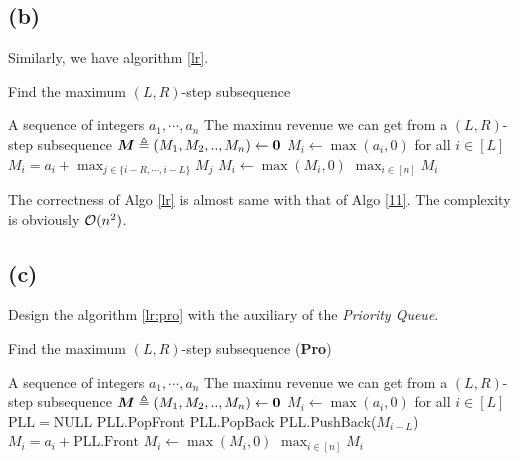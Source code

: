 \documentclass{article}
\begin{document}
\subsection*{(b)}
Similarly, we have algorithm \ref{lr}.
\begin{algorithm}[htbp]
	\caption{Find the maximum $(L,R)$-step subsequence}
	\label{lr}
	\begin{algorithmic}[1]
		\renewcommand{\algorithmicrequire}{\textbf{Input:}}
		\renewcommand{\algorithmicensure}{\textbf{Output:}}
		\renewcommand{\algorithmiccomment}[1]{\hfill\textit{\textcolor{blue}{\##1}}}
		\REQUIRE A sequence of integers $a_1,\cdots,a_n$
		\ENSURE The maximu revenue we can get from a $(L,R)$-step subsequence
		\STATE $\boldsymbol{M}\triangleq(M_1,M_2,..,M_n)\gets\boldsymbol{0}$
		\STATE $M_i\gets\max(a_i,0)$ for all $i\in[L]$
		\STATE $M_i=a_i+\max_{j\in\{i-R,\cdots,i-L\}}M_j$ 
		\STATE $M_i\gets \max(M_i,0)$
		\ENDFOR
		\RETURN $\max_{i\in[n]}M_i$
	\end{algorithmic} 
\end{algorithm}

The correctness of Algo \ref{lr} is almost same with that of Algo \ref{11}. The complexity is obviously $\mathcal{O}(n^2)$.

\subsection*{(c)}
Design the algorithm \ref{lr:pro} with the auxiliary of the \textit{Priority Queue}.
\begin{algorithm}[htbp]
	\caption{Find the maximum $(L,R)$-step subsequence (\textbf{Pro})}
	\label{lr:pro}
	\begin{algorithmic}[1]
		\renewcommand{\algorithmicrequire}{\textbf{Input:}}
		\renewcommand{\algorithmicensure}{\textbf{Output:}}
		\renewcommand{\algorithmiccomment}[1]{\hfill\textit{\textcolor{blue}{\##1}}}
		\REQUIRE A sequence of integers $a_1,\cdots,a_n$
		\ENSURE The maximu revenue we can get from a $(L,R)$-step subsequence
		\STATE $\boldsymbol{M}\triangleq(M_1,M_2,..,M_n)\gets\boldsymbol{0}$
		\STATE $M_i\gets\max(a_i,0)$ for all $i\in[L]$
		\STATE $\mathrm{PLL}=\mathrm{NULL}$
		\STATE PLL.PopFront
		\ENDIF
		\STATE PLL.PopBack
		\ENDWHILE
		\STATE PLL.PushBack($M_{i-L}$)
		\STATE $M_i=a_i+\mathrm{PLL.Front}$
		\STATE $M_i\gets \max(M_i,0)$
		\ENDFOR
		\RETURN $\max_{i\in[n]}M_i$
	\end{algorithmic} 
\end{algorithm}
\end{document}
